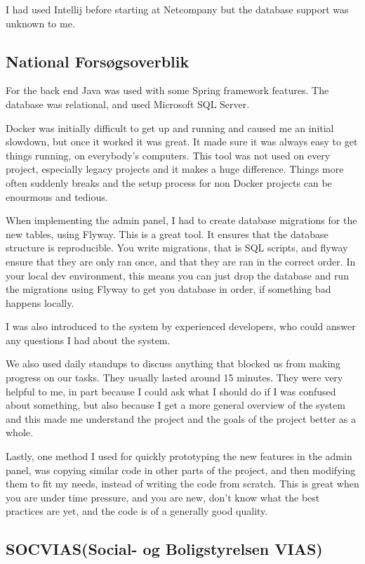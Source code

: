 \documentclass[../main.tex]{subfiles}
\begin{document}
I had used Intellij before starting at Netcompany but the database support was unknown to me.
\subsection{National Forsøgsoverblik}
\label{sec:methods-nationaltforsoegsoverblik}

For the back end Java was used with some Spring framework features. The database was relational, and used Microsoft SQL Server. 

Docker was initially difficult to get up and running and caused me an initial slowdown, but once it worked it was great. It made sure it was always easy to get things running, on everybody's computers. This tool was not used on every project, especially legacy projects and it makes a huge difference. Things more often suddenly breaks and the setup process for non Docker projects can be enourmous and tedious. 

When implementing the admin panel, I had to create database migrations for the new tables, using Flyway. This is a great tool. It ensures that the database structure is reproducible. You write migrations, that is SQL scripts, and flyway ensure that they are only ran once, and that they are ran in the correct order. In your local dev environment, this means you can just drop the database and run the migrations using Flyway to get you database in order, if something bad happens locally.

I was also introduced to the system by experienced developers, who could answer any questions I had about the system.

We also used daily standups to discuss anything that blocked us from making progress on our tasks. They usually lasted around 15 minutes. They were very helpful to me, in part because I could ask what I should do if I was confused about something, but also because I get a more general overview of the system and this made me understand the project and the goals of the project better as a whole.

Lastly, one method I used for quickly prototyping the new features in the admin panel, was copying similar code in other parts of the project, and then modifying them to fit my needs, instead of writing the code from scratch. This is great when you are under time pressure, and you are new, don't know what the best practices are yet, and the code is of a generally good quality. 

\subsection{SOCVIAS(Social- og Boligstyrelsen VIAS)}
\end{document}
